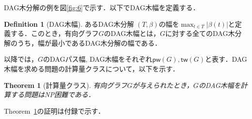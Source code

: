 \documentclass[master]{kuisthesis}		%
\theoremstyle{plain}
\newtheorem{theorem}{Theorem}
\theoremstyle{definition}
\newtheorem{definition*}{Definition}
\begin{document}

DAG木分解の例を図\ref{fig:6}で示す．以下でDAG木幅を定義する．

\begin{definition*}[DAG木幅]
    あるDAG木分解 $(T, \beta)$の幅を$\max_{t \in T}|\beta(t)|$と定義する．このとき，有向グラフ$G$のDAG木幅とは，$G$に対する全てのDAG木分解のうち，幅が最小であるDAG木分解の幅である．
\end{definition*}

以降では，$G$のDAGパス幅, DAG木幅をそれぞれ$\mathsf{pw}(G), \mathsf{tw}(G)$と表す．DAG木幅を求める問題の計算量クラスについて，以下を示す．

\begin{theorem}[計算量クラス]\label{NP困難}
    有向グラフ$G$が与えられたとき，$G$のDAG木幅を計算する問題はNP困難である．
\end{theorem}

Theorem~\ref{NP困難}の証明は付録で示す．
\end{document}
